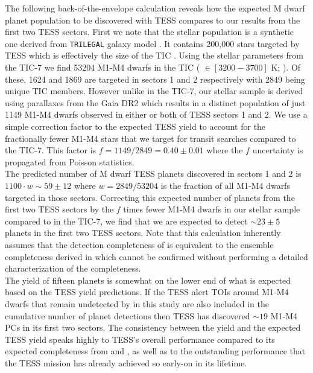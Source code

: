 The following back-of-the-envelope calculation reveals how the expected
M dwarf planet population to be discovered with TESS compares to our \pipeline{} results
from the first two TESS sectors. First we note
that the \cite{sullivan15} stellar population is a synthetic one derived from \texttt{TRILEGAL}
galaxy model \citep{girardi05}. It contains 200,000 stars targeted by TESS which is
effectively the size of the TIC \citep{stassun17}. Using the stellar parameters from the TIC-7
we find 53204 M1-M4 dwarfs in the TIC (\teff{} $\in [3200-3700]$ K; \citealt{pecaut13}).
Of these, 1624 and 1869 are targeted in sectors 1 and 2 respectively with 2849
being unique TIC members. However unlike in the TIC-7,
our stellar sample is derived using parallaxes from the Gaia DR2 which results in
a distinct population of just 1149 M1-M4 dwarfs observed in either or both of TESS sectors 1
and 2. We use a simple correction factor to the expected TESS yield to account for the
fractionally fewer M1-M4 stars that we target for transit searches compared to the TIC-7.
This factor is $f=1149/2849 = 0.40 \pm 0.01$ where the $f$ uncertainty
is propagated from Poisson statistics.  \\

The predicted number of M dwarf TESS planets discovered in sectors 1 and 2 is
$1100\cdot w \sim 59 \pm 12$ where $w=2849/53204$ is the fraction of all M1-M4 dwarfs targeted in
those sectors. Correcting this expected number of planets from the first two TESS sectors
by the $f$ times fewer M1-M4 dwarfs in our stellar sample compared to in the TIC-7,
we find that we are expected to detect
$\sim 23 \pm 5$ planets in the first two TESS sectors.
Note that this calculation inherently assumes that the detection
completeness of \pipeline{} is equivalent to the ensemble completeness derived in \cite{ballard18}
which cannot be confirmed without performing a detailed characterization of the \pipeline{}
completeness. \\

The \pipeline{} yield of fifteen planets
is somewhat on the lower end of what is expected based on the TESS yield predictions.
If the TESS alert TOIs around M1-M4 dwarfs that remain undetected by \pipeline{} in this study are
also included in the cumulative number of planet detections then TESS has discovered $\sim 19$
M1-M4 PCs in its first two sectors.
The consistency between the \pipeline{} yield and the expected TESS yield speaks highly to TESS's
overall performance compared to its expected completeness from \cite{sullivan15} and
\cite{ballard18}, as well as to the outstanding performance that the TESS mission has
already achieved so early-on in its lifetime. \\


